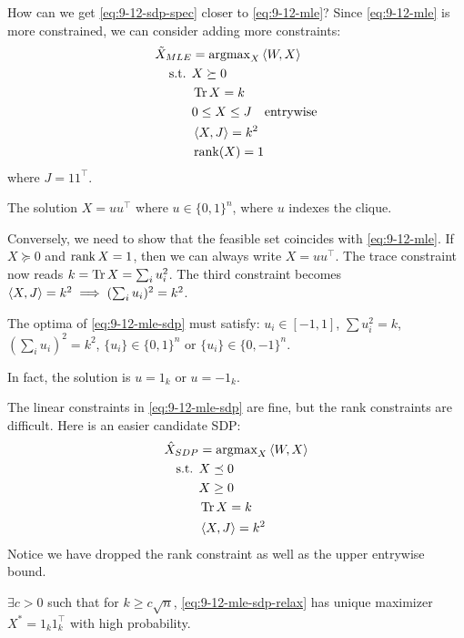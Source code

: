 How can we get \cref{eq:9-12-sdp-spec} closer to \cref{eq:9-12-mle}? Since
\cref{eq:9-12-mle} is more constrained, we can consider adding more constraints:
\begin{align}\label{eq:9-12-mle-sdp}
    \tilde{X}_{MLE} &= \operatorname{argmax}_X \braket{W, X} \\
    \text{s.t. } & X \succeq 0 \\
                & \operatorname{Tr} X = k \\
                & 0 \leq X \leq J \quad\text{entrywise}\\
                & \braket{X, J} = k^2 \\
                & \operatorname{rank}(X) = 1
\end{align}
where $J = 1 1^\top$.

The solution $X = u u^\top$ where $u \in \{0,1\}^n$, where $u$
indexes the clique.

Conversely, we need to show that the feasible set coincides with \cref{eq:9-12-mle}.
If $X \succeq 0$ and $\operatorname{rank} X = 1$, then we can always write
$X = u u^\top$. The trace constraint now reads $k = \operatorname{Tr} X = \sum_i u_i^2$.
The third constraint becomes $\braket{X, J} = k^2 \implies (\sum_i u_i)^2 = k^2$.

\begin{proposition}
    The optima of \cref{eq:9-12-mle-sdp} must satisfy:
    $u_i \in [-1, 1]$, $\sum u_i^2 = k$, $(\sum_i u_i)^2 = k^2$, 
    $\{u_i\} \in \{0,1\}^n$ or $\{u_i\} \in \{0, -1\}^n$.
    
    In fact, the solution is $u = 1_k$ or $u = -1_k$.
\end{proposition}

The linear constraints in \cref{eq:9-12-mle-sdp} are fine, but the rank constraints
are difficult.
Here is an easier candidate SDP:
\begin{align}\label{eq:9-12-mle-sdp-relax}
    \hat{X}_{SDP} &= \operatorname{argmax}_X \braket{W, X} \\
    \text{s.t. } & X \preceq 0 \\
                 & X \geq 0 \\
                 & \operatorname{Tr} X = k \\
                 & \braket{X, J} = k^2
\end{align}
Notice we have dropped the rank constraint as well as the upper entrywise bound.

\begin{theorem}
    $\exists c > 0$ such that for $k \geq c \sqrt{n}$, \cref{eq:9-12-mle-sdp-relax}
    has unique maximizer $X^* = 1_k 1_k^\top$ with high probability.
\end{theorem}

